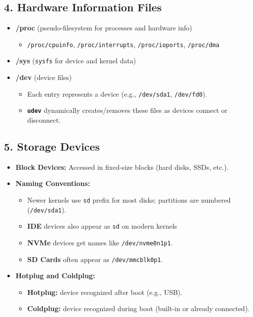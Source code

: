 \documentclass[12pt,a4paper]{report}
\begin{document}
\subsection*{4. Hardware Information Files}
\begin{itemize}
    \item \textbf{/proc} (pseudo-filesystem for processes and hardware info)
    \begin{itemize}
        \item \texttt{/proc/cpuinfo}, \texttt{/proc/interrupts}, \texttt{/proc/ioports}, \texttt{/proc/dma}
    \end{itemize}
    \item \textbf{/sys} (\texttt{sysfs} for device and kernel data)
    \item \textbf{/dev} (device files)
    \begin{itemize}
        \item Each entry represents a device (e.g., \texttt{/dev/sda1}, \texttt{/dev/fd0}).
        \item \textbf{\texttt{udev}} dynamically creates/removes these files as devices connect or disconnect.
    \end{itemize}
\end{itemize}

\subsection*{5. Storage Devices}
\begin{itemize}
    \item \textbf{Block Devices:} Accessed in fixed-size blocks (hard disks, SSDs, etc.).
    \item \textbf{Naming Conventions:}
    \begin{itemize}
        \item Newer kernels use \texttt{sd} prefix for most disks; partitions are numbered (\texttt{/dev/sda1}).
        \item \textbf{IDE} devices also appear as \texttt{sd} on modern kernels
        \item \textbf{NVMe} devices get names like \texttt{/dev/nvme0n1p1}.
        \item \textbf{SD Cards} often appear as \texttt{/dev/mmcblk0p1}.
    \end{itemize}

    \item \textbf{Hotplug and Coldplug:}
    \begin{itemize}
        \item \textbf{Hotplug:} device recognized after boot (e.g., USB).
        \item \textbf{Coldplug:} device recognized during boot (built-in or already connected).
    \end{itemize}
\end{itemize}
\end{document}
